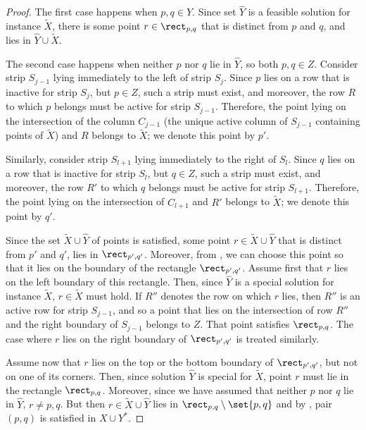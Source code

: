 \begin{proof}
The first case happens when $p,q\in \hat Y$. Since set $\hat Y$ is a feasible solution for instance $\widetilde{X}$, there is some point $r\in \rect_{p,q}$ that is distinct from $p$ and $q$, and lies in $\hat Y\cup \widetilde{X}$. %
%


The second case happens when neither $p$ nor $q$ lie in $\hat Y$, so both $p,q\in Z$. Consider strip $S_{j-1}$ lying immediately to the left of strip $S_j$. Since $p$ lies on a row that is inactive for strip $S_j$, but $p\in Z$, such a strip must exist, and moreover, the row $R$ to which $p$ belongs must be active for strip $S_{j-1}$. Therefore, the point lying on the intersection of the column $C_{j-1}$ (the unique active column of $S_{j-1}$ containing points of $\widetilde{X}$) and $R$ belongs to $\widetilde{X}$; we denote this point by $p'$. 

Similarly, consider strip $S_{l+1}$ lying immediately to the right of $S_l$. Since $q$ lies on a row that is inactive for strip $S_l$, but $q\in Z$, such a strip must exist, and moreover, the row $R'$ to which $q$ belongs must be active for strip $S_{l+1}$. Therefore, the point lying on the intersection of $C_{l+1}$ and $R'$ belongs to $\widetilde{X}$; we denote this point by $q'$.

Since the set $\widetilde{X}\cup \hat Y$ of points is satisfied, some point $r\in \widetilde{X}\cup \hat Y$ that is distinct from $p'$ and $q'$, lies in $\rect_{p',q'}$. Moreover, from , we can choose this point so that it lies on the boundary of the rectangle $\rect_{p',q'}$. Assume first that $r$ lies on the left boundary of this rectangle. Then, since $\hat Y$ is a special solution for instance $\widetilde{X}$, $r\in \widetilde{X}$ must hold. If $R''$ denotes the row on which $r$ lies, then $R''$ is an active row for strip $S_{j-1}$, and so a point that lies on the intersection of row $R''$ and the right boundary of $S_{j-1}$ belongs to $Z$. That point satisfies $\rect_{p,q}$. The case where $r$ lies on the right boundary of $\rect_{p',q'}$ is treated similarly.

Assume now that $r$ lies on the top or the bottom boundary of $\rect_{p',q'}$, but not on one of its corners. Then, since solution $\hat Y$ is special for $\widetilde{X}$, point $r$ must lie in the rectangle $\rect_{p,q}$. Moreover, since we have assumed that neither $p$ nor $q$ lie in $\hat Y$, $r\neq p,q$. But then $r\in \widetilde{X}\cup \hat Y$ lies in $\rect_{p,q}\setminus\set{p,q}$ and by , pair $(p,q)$ is satisfied in $X\cup Y^*$.




\end{proof}
